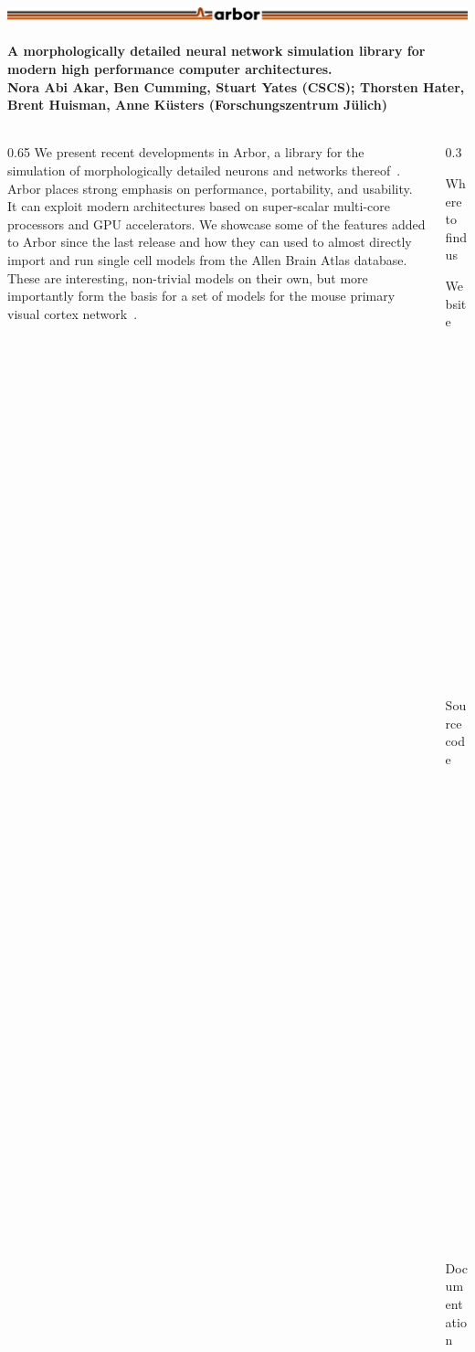 \documentclass{beamer}
\begin{document}
\begin{frame}[t, fragile]
  \frametitle{\includegraphics[width=0.66\linewidth]{img/arbor-lines-proto-colour-full}}
  \framesubtitle{A morphologically detailed neural network simulation library for modern high performance computer architectures.\\
    \tiny{Nora Abi Akar, Ben Cumming, Stuart Yates (CSCS); Thorsten Hater, Brent Huisman, Anne Küsters (Forschungszentrum Jülich)}}
  \begin{columns}[onlytextwidth,T]
    \begin{column}{0.65\textwidth}
      We present recent developments in Arbor, a library for the simulation of
      morphologically detailed neurons and networks thereof~\cite{arbor}. Arbor
      places strong emphasis on performance, portability, and usability. It can
      exploit modern architectures based on super-scalar multi-core processors
      and GPU accelerators. We showcase some of the features added to Arbor
      since the last release and how they can used to almost directly import and
      run single cell models from the Allen Brain Atlas database. These are
      interesting, non-trivial models on their own, but more importantly form
      the basis for a set of models for the mouse primary visual cortex
      network~\cite{allen-v1}.
    \end{column}
    \begin{column}{0.3\textwidth}
      \vspace*{-1ex}
      \begin{block}{Where to find us}
        \begin{description}
          \item[Website] \href{https://arbor-sim.github.io}{arbor-sim.github.io}
          \item[Source code] \href{https://github.com/arbor-sim/arbor}{github.com/arbor-sim/arbor}
          \item[Documentation] \href{https://arbor.readthedocs.io}{arbor.readthedocs.io}
          \item[Contact] \href{mailto:arbor-sim@fz-juelich.de}{arbor-sim@fz-juelich.de}
        \end{description}
      \end{block}
    \end{column}
  \end{columns}
  \vspace*{-2ex}

\end{frame}
\end{document}
